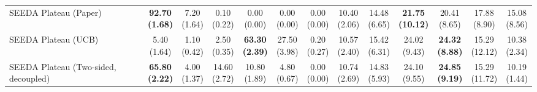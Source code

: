 \begin{table}[H]
{\begin{tabular}{l|cccccc|cccccc}
SEEDA Plateau (Paper) & \bfseries \makecell{92.70 \\ (1.68)} & \makecell{7.20 \\ (1.64)} & {\cellcolor[HTML]{C8E6C9}} \makecell{0.10 \\ (0.22)} & \makecell{0.00 \\ (0.00)} & \makecell{0.00 \\ (0.00)} & \makecell{0.00 \\ (0.00)} & \makecell{10.40 \\ (2.06)} & \makecell{14.48 \\ (6.65)} & {\cellcolor[HTML]{C8E6C9}} \bfseries \makecell{21.75 \\ (10.12)} & \makecell{20.41 \\ (8.65)} & \makecell{17.88 \\ (8.90)} & \makecell{15.08 \\ (8.56)} \\
SEEDA Plateau (UCB) & \makecell{5.40 \\ (1.64)} & \makecell{1.10 \\ (0.42)} & {\cellcolor[HTML]{C8E6C9}} \makecell{2.50 \\ (0.35)} & \bfseries \makecell{63.30 \\ (2.39)} & \makecell{27.50 \\ (3.98)} & \makecell{0.20 \\ (0.27)} & \makecell{10.57 \\ (2.40)} & \makecell{15.42 \\ (6.31)} & {\cellcolor[HTML]{C8E6C9}} \makecell{24.02 \\ (9.43)} & \bfseries \makecell{24.32 \\ (8.88)} & \makecell{15.29 \\ (12.12)} & \makecell{10.38 \\ (2.34)} \\
SEEDA Plateau (Two-sided, decoupled) & \bfseries \makecell{65.80 \\ (2.22)} & \makecell{4.00 \\ (1.37)} & {\cellcolor[HTML]{C8E6C9}} \makecell{14.60 \\ (2.72)} & \makecell{10.80 \\ (1.89)} & \makecell{4.80 \\ (0.67)} & \makecell{0.00 \\ (0.00)} & \makecell{10.74 \\ (2.69)} & \makecell{14.83 \\ (5.93)} & {\cellcolor[HTML]{C8E6C9}} \makecell{24.10 \\ (9.55)} & \bfseries \makecell{24.85 \\ (9.19)} & \makecell{15.29 \\ (11.72)} & \makecell{10.19 \\ (1.44)} \\

\end{tabular}}
\end{table}
